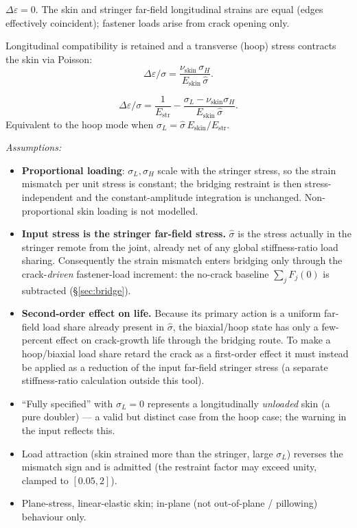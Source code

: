 \documentclass[11pt]{article}
\newenvironment{assume}{\par\smallskip\noindent\textit{Assumptions:}\begin{itemize}[leftmargin=1.5em,topsep=2pt,itemsep=1pt]}{\end{itemize}\par\smallskip}
\begin{document}
\begin{description}[leftmargin=1.5em]
\item[Strain-matched (default).] $\Delta\varepsilon=0$. The skin and stringer
  far-field longitudinal strains are equal (edges effectively coincident);
  fastener loads arise from crack opening only.
\item[Strain-matched $+$ hoop $\sigma_H$ (Poisson).] Longitudinal compatibility
  is retained and a transverse (hoop) stress contracts the skin via Poisson:
  \begin{equation}
  \Delta\varepsilon/\sigma=\frac{\nu_{\text{skin}}\,\sigma_H}{E_{\text{skin}}\,\hat\sigma}.
  \end{equation}
\item[Fully specified $(\sigma_L,\sigma_H)$.]
  \begin{equation}
  \Delta\varepsilon/\sigma=\frac{1}{E_{\text{str}}}
   -\frac{\sigma_L-\nu_{\text{skin}}\sigma_H}{E_{\text{skin}}\,\hat\sigma}.
  \end{equation}
  Equivalent to the hoop mode when $\sigma_L=\hat\sigma\,E_{\text{skin}}/E_{\text{str}}$.
\end{description}

\begin{assume}
\item \textbf{Proportional loading}: $\sigma_L,\sigma_H$ scale with the stringer
  stress, so the strain mismatch per unit stress is constant; the bridging
  restraint is then stress-independent and the constant-amplitude integration is
  unchanged. Non-proportional skin loading is not modelled.
\item \textbf{Input stress is the stringer far-field stress.} $\hat\sigma$ is the
  stress actually in the stringer remote from the joint, already net of any
  global stiffness-ratio load sharing. Consequently the strain mismatch enters
  bridging only through the crack-\emph{driven} fastener-load increment: the
  no-crack baseline $\sum_j F_j(0)$ is subtracted (\S\ref{sec:bridge}).
\item \textbf{Second-order effect on life.} Because its primary action is a
  uniform far-field load share already present in $\hat\sigma$, the biaxial/hoop
  state has only a few-percent effect on crack-growth life through the bridging
  route. To make a hoop/biaxial load share retard the crack as a first-order
  effect it must instead be applied as a reduction of the input far-field
  stringer stress (a separate stiffness-ratio calculation outside this tool).
\item ``Fully specified'' with $\sigma_L=0$ represents a longitudinally
  \emph{unloaded} skin (a pure doubler) --- a valid but distinct case from the
  hoop case; the warning in the input reflects this.
\item Load attraction (skin strained more than the stringer, large $\sigma_L$)
  reverses the mismatch sign and is admitted (the restraint factor may exceed
  unity, clamped to $[0.05,2]$).
\item Plane-stress, linear-elastic skin; in-plane (not out-of-plane / pillowing)
  behaviour only.
\end{assume}
\end{document}
